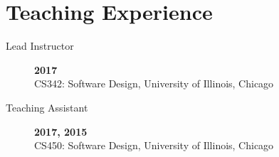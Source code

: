 \documentclass[wideaddress]{vitae}
\begin{document}
  \section{Teaching Experience}
  \begin{description}
    \item[Lead Instructor] \hfill \textbf{2017}\\
    CS342: Software Design, University of Illinois, Chicago %

    \item[Teaching Assistant] \hfill \textbf{2017, 2015}\\
    CS450: Software Design, University of Illinois, Chicago %
  \end{description}





\end{document}
